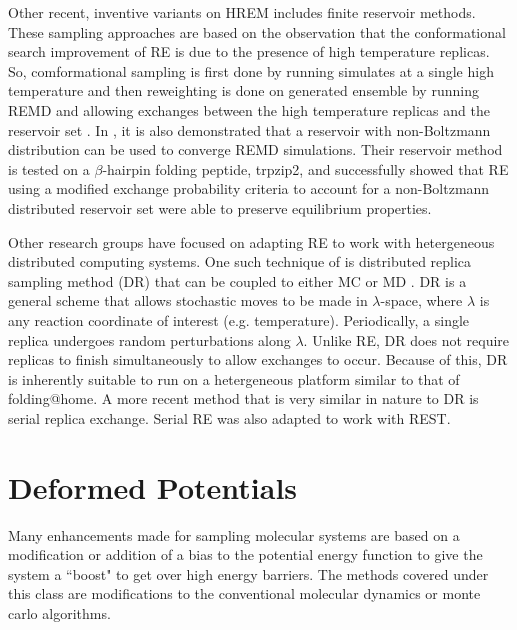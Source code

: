 \documentclass[12pt]{article}
\numberwithin{equation}{subsection}
\begin{document}
\begin{spacing}{1}
Other recent, inventive variants on HREM includes finite reservoir methods. These sampling approaches are based on the observation that the conformational search improvement of RE is due to the presence of high temperature replicas. So, comformational sampling is first done by running simulates at a single high temperature and then reweighting is done on generated ensemble by running REMD and allowing exchanges between the high temperature replicas and the reservoir set \cite{finite,csimmer}. In \cite{csimmer}, it is also demonstrated that a reservoir with non-Boltzmann distribution can be used to converge REMD simulations. Their reservoir method is tested on a $\beta$-hairpin folding peptide, trpzip2, and successfully showed that RE using a modified exchange probability criteria to account for a non-Boltzmann distributed reservoir set were able to preserve equilibrium properties.

Other research groups have focused on adapting RE to work with hetergeneous distributed computing systems.  One such technique of is distributed replica sampling method (DR) that can be coupled to either MC or MD \cite{DR}.  DR is a general scheme that allows stochastic moves to be made in $\lambda$-space, where $\lambda$ is any reaction coordinate of interest (e.g. temperature). Periodically, a single replica undergoes random perturbations along $\lambda$. Unlike RE, DR does not require replicas to finish simultaneously to allow exchanges to occur. Because of this, DR is inherently suitable to run on a hetergeneous platform similar to that of folding@home. A more recent method that is very similar in nature to DR is serial replica exchange. Serial RE was also adapted to work with REST. \cite{serial}

\section{Deformed Potentials}
Many enhancements made for sampling molecular systems are based on a modification or addition of a bias to the potential energy function to give the system a ``boost" to get over high energy barriers.  The methods covered under this class are modifications to the conventional molecular dynamics or monte carlo algorithms.  


\end{spacing}
\end{document}
